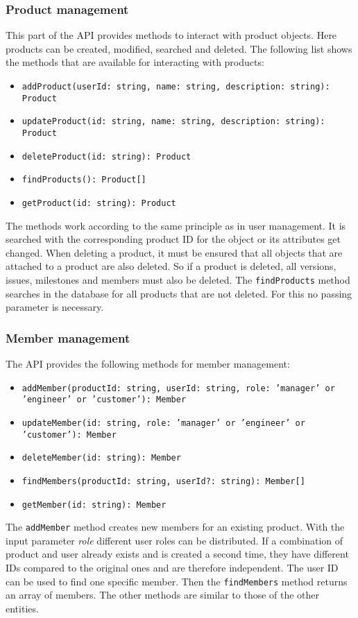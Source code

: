     \subsubsection*{Product management}
    This part of the API provides methods to interact with product objects. Here products can be created, modified, searched and deleted. The following list shows the methods that are available for interacting with products:
    \begin{itemize}
        \item \texttt{addProduct(userId: string, name: string, description: string): Product}
        \item \texttt{updateProduct(id: string, name: string, description: string): Product}
        \item \texttt{deleteProduct(id: string): Product}
        \item \texttt{findProducts(): Product[]}
        \item \texttt{getProduct(id: string): Product}
    \end{itemize}
    The methods work according to the same principle as in user management. It is searched with the corresponding product ID for the object or its attributes get changed. When deleting a product, it must be ensured that all objects that are attached to a product are also deleted. So if a product is deleted, all versions, issues, milestones and members must also be deleted.
    The \texttt{findProducts} method searches in the database for all products that are not deleted. For this no passing parameter is necessary.

    \subsubsection*{Member management}
    The API provides the following methods for member management:
    \begin{itemize}
        \item \texttt{addMember(productId: string, userId: string, role: 'manager' or 'engineer' or 'customer'): Member}
        \item \texttt{updateMember(id: string, role: 'manager' or 'engineer' or 'customer'): Member}
        \item \texttt{deleteMember(id: string): Member}
        \item \texttt{findMembers(productId: string, userId?: string): Member[]}
        \item \texttt{getMember(id: string): Member}
    \end{itemize}
    The \texttt{addMember} method creates new members for an existing product. With the input parameter \textit{role} different user roles can be distributed. If a combination of product and user already exists and is created a second time, they have different IDs compared to the original ones and are therefore independent. 
    The user ID can be used to find one specific member. Then the \texttt{findMembers} method returns an array of members. The other methods are similar to those of the other entities.
    
